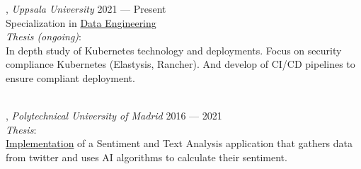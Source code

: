 , \textit{Uppsala University}	\hfill 2021 --- Present \\
Specialization in \href{https://www.uu.se/en/admissions/master/selma/studieplan/?planId=1381&pKod=TDA2M&pInr=DAEN}{Data Engineering} \\
\textit{Thesis (ongoing)}: \\
In depth study of Kubernetes technology and deployments. Focus on security compliance Kubernetes (Elastysis, Rancher). And develop of CI/CD pipelines to ensure compliant deployment.

\skills{} \textit{}	\hfill \\

, \textit{Polytechnical University of Madrid} \hfill	2016 --- 2021 \\
\textit{Thesis}: \\
\href{https://oa.upm.es/68107/}{Implementation} of a Sentiment and Text Analysis application that gathers data from twitter and uses AI algorithms to calculate their sentiment.

